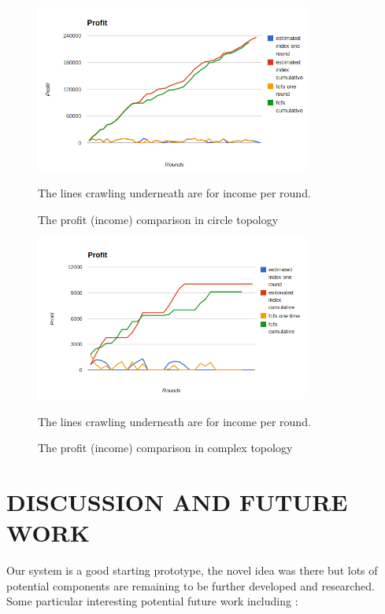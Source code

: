 \documentclass[a4paper,11pt,twocolumn]{article}
\begin{document}
\begin{figure}[ht!]
\centering
\includegraphics[width=90mm]{circle_profit.png}
\caption{The profit (income) comparison in circle topology}
The lines crawling underneath are for income per round.
\label{overflow}
\end{figure}

\begin{figure}[ht!]
\centering
\includegraphics[width=90mm]{mytop_profit.png}
\caption{The profit (income) comparison in complex topology}
The lines crawling underneath are for income per round.
\label{overflow}
\end{figure}

\section{DISCUSSION AND FUTURE WORK}

Our system is a good starting prototype, the novel idea was there but lots of potential components are remaining to be 
further developed and researched. Some particular interesting potential future work including :
\end{document}
